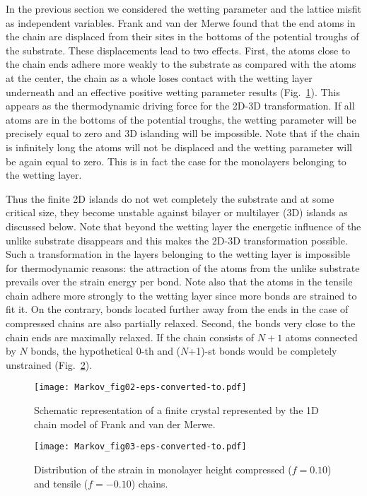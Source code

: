 \documentclass[aps,prl,showpacs,twocolumn,byrevtex,floatfix]{revtex4-1}
\begin{document}
In the previous section we considered the wetting parameter and the lattice
misfit as independent variables. Frank and van der Merwe found that the end
atoms in the chain are displaced from their sites in the bottoms of the
potential troughs of the substrate. These displacements lead to two effects.
First, the atoms close to the chain ends adhere more weakly to the substrate as
compared with the atoms at the center, the chain as a whole loses contact with
the wetting layer underneath and an effective positive wetting parameter results
(Fig.\ \ref{FMchain}). This appears as the thermodynamic driving force for
the 2D-3D transformation. If all atoms are in the bottoms of the potential
troughs, the wetting parameter will be precisely equal to zero and 3D islanding
will be impossible. Note that if the chain is infinitely long the atoms will not
be displaced and the wetting parameter will be again equal to zero. This is
in fact the case for the monolayers belonging to the wetting layer.

Thus the finite 2D islands do not wet completely the substrate and at some
critical size, they become unstable against bilayer or multilayer (3D) islands
as discussed below. Note that beyond the wetting layer
the energetic influence of the unlike substrate disappears and this makes the
2D-3D transformation possible. Such a transformation in the layers belonging
to the wetting layer is impossible for thermodynamic reasons: the attraction of
the atoms from the unlike substrate prevails over the strain energy per bond.
Note also that the atoms in the tensile chain adhere more strongly to the
wetting layer since more bonds are strained to fit it. On the contrary, bonds
located further away from the ends in the case of compressed chains are also
partially relaxed. Second, the bonds very close to the chain ends are 
maximally relaxed. If the chain consists of $N+1$ atoms connected by $N$ 
bonds, the hypothetical 0-th and ($N$+1)-st bonds would be completely 
unstrained (Fig.\ \ref{strains}).\cite{Frank491,Markov84,Korutcheva00}

\begin{figure}[htb]
\texttt{[image: Markov\_fig02-eps-converted-to.pdf]}
\caption{\label{FMchain} Schematic representation of a finite crystal
represented by the 1D chain model of Frank and van der
Merwe.\cite{Frank49,Frank491}}
\end{figure}


\begin{figure}[htb]
\texttt{[image: Markov\_fig03-eps-converted-to.pdf]}
\caption{\label{strains} Distribution of the strain in monolayer height
compressed ($f = 0.10$) and tensile ($f = - 0.10$) chains.}
\end{figure}
\end{document}

